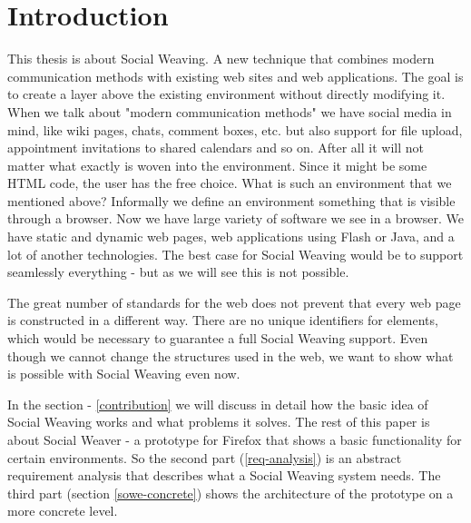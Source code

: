 \section{Introduction}

This thesis is about Social Weaving. A new technique that combines modern communication methods with existing web sites and web applications. The goal is to create a layer above the existing environment without directly modifying it. When we talk about "modern communication methods" we have social media in mind, like wiki pages, chats, comment boxes, etc. but also support for file upload, appointment invitations to shared calendars and so on. After all it will not matter what exactly is woven into the environment. Since it might be some HTML code, the user has the free choice. What is such an environment that we mentioned above? Informally we define an environment something that is visible through a browser. Now we have large variety of software we see in a browser. We have static and dynamic web pages, web applications using Flash or Java, and a lot of another technologies. The best case for Social Weaving would be to support seamlessly everything - but as we will see this is not possible.

The great number of standards for the web does not prevent that every web page is constructed in a different way. There are no unique identifiers for elements, which would be necessary to guarantee a full Social Weaving support. Even though we cannot change the structures used in the web, we want to show what is possible with Social Weaving even now. 

In the section  - \ref{contribution} we will discuss in detail how the basic idea of Social Weaving works and what problems it solves. The rest of this paper is about Social Weaver - a prototype for Firefox that shows a basic functionality for certain environments. So the second part (\ref{req-analysis}) is an abstract requirement analysis that describes what a Social Weaving system needs. The third part (section \ref{sowe-concrete}) shows the architecture of the prototype on a more concrete level.

